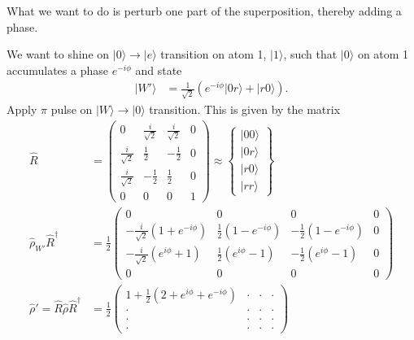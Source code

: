\documentclass[a4paper, 11pt, normalem]{report}
\begin{document}
What we want to do is perturb one part of the superposition, thereby adding a phase.
\begin{figure}[H]
    \centering
    \vspace{-20pt}
\end{figure}
We want to shine on $|0\rangle\to|e\rangle$ transition on atom 1, $|1\rangle$, such that $|0\rangle$ on atom 1 accumulates a phase $e^{-i\phi}$ and state
\begin{align}
    |W'\rangle &= \frac{1}{\sqrt{2}}\left(e^{-i\phi}|0r\rangle + |r0\rangle\right).
\end{align}
Apply $\pi$ pulse on $|W\rangle\to|0\rangle$ transition.
This is given by the matrix
\begin{align}
    \hat{R} &= \begin{pmatrix} 0 & \frac{i}{\sqrt{2}} & \frac{i}{\sqrt{2}} & 0 \\ \frac{i}{\sqrt{2}} & \frac12 & -\frac12 & 0 \\ \frac{i}{\sqrt{2}} & -\frac12 & \frac12 & 0 \\ 0 & 0 & 0 & 1 \end{pmatrix} \approx \begin{Bmatrix} |00\rangle \\ |0r\rangle \\ |r0\rangle \\ |rr\rangle \end{Bmatrix} \\
    \hat{\rho}_{W'}\hat{R}^\dagger &= \frac12 \begin{pmatrix} 0 & 0 & 0 & 0 \\ -\frac{i}{\sqrt{2}}\left(1+e^{-i\phi}\right) & \frac12(1-e^{-i\phi}) & -\frac12(1-e^{-i\phi}) & 0 \\ -\frac{i}{\sqrt{2}}\left(e^{i\phi}+1\right) & \frac12(e^{i\phi}-1) & -\frac12(e^{i\phi}-1) & 0 \\ 0 & 0 & 0 & 0 \end{pmatrix} \\
    \hat{\rho}' = \hat{R}\hat{\rho}\hat{R}^\dagger &= \frac12 \begin{pmatrix}1 + \frac12(2+e^{i\phi}+e^{-i\phi}) & \cdot & \cdot & \cdot \\ \cdot & \cdot & \cdot & \cdot \\ \cdot & \cdot & \cdot & \cdot \\ \cdot & \cdot & \cdot & \cdot \end{pmatrix}
\end{align}
\end{document}
